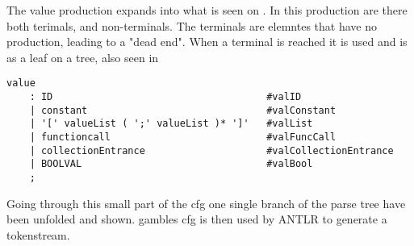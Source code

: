 The value production expands into what is seen on .
In this production are there both terimals, and non-terminals.
The terminals are elemntes that have no production, leading to a "dead end".
When a terminal is reached it is used and is as a leaf on a tree, also seen in 
\begin{lstlisting}[caption={\acrshort{cfg} Value},label={lst:value},numbers=none]
value
    : ID                                     #valID
    | constant                               #valConstant
    | '[' valueList ( ';' valueList )* ']'   #valList
    | functioncall                           #valFuncCall
    | collectionEntrance                     #valCollectionEntrance
    | BOOLVAL                                #valBool
    ;
\end{lstlisting}

Going through this small part of the \acrshort{cfg} one single branch of the parse tree have been unfolded and shown.
\gls{gamble}s \acrshort{cfg} is then used by ANTLR to generate a tokenstream. 